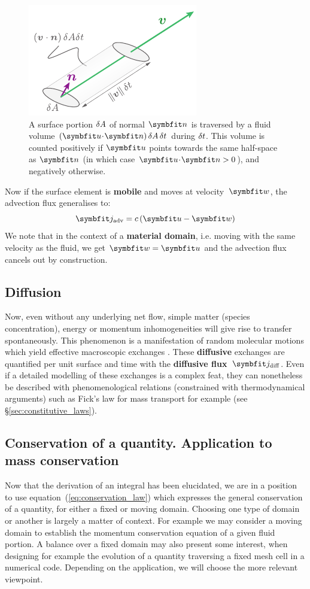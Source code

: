 \begin{figure}[htbp]
\begin{center}
\includegraphics{./pics/slanted_cylinder.pdf}
\caption{A surface portion $\delta A$ of normal $\bn$ is traversed by a fluid volume $\lp\bu \!\cdot\!\bn\rp\delA\,\delt$ during $\delta t$. This volume is counted positively if  $\bu$ points towards the same half-space as $\bn$ (in which case $\bu \!\cdot\! \bn > 0$), and negatively otherwise.}
\label{fig:slanted_cylinder}
\end{center}
\end{figure}
Now if the surface element is \textbf{mobile} and moves at velocity~$\bw$, the advection flux generalises to: 
 \begin{equation}
\bj_\text{adv} = c\, (\bu-\bw)
\end{equation}
We note that in the context of a \textbf{material domain}, i.e. moving with the same velocity as the fluid, we get $\bw = \bu$ and the advection flux cancels out by construction.
\subsection{Diffusion}
Now, even without any underlying net flow, simple matter (species concentration), energy or momentum inhomogeneities will give rise to transfer spontaneously. This phenomenon is a manifestation of random molecular motions which yield effective macroscopic exchanges \citep{Leal2007}. These \textbf{diffusive} exchanges are quantified per unit surface and time with the \textbf{diffusive flux}~$\bj_\text{diff}$. 
Even if a detailed modelling of these exchanges is a complex feat, they can nonetheless be described with phenomenological relations (constrained with thermodynamical arguments) such as Fick's law for mass transport for example (see \S\ref{sec:constitutive_laws}).

\subsection{Conservation of a quantity. Application to mass conservation}
Now that the derivation of an integral has been elucidated, we are in a position to use equation~(\ref{eq:conservation_law}) which expresses the general conservation of a quantity, for either a fixed or moving domain. Choosing one type of domain or another is largely a matter of context. For example we may consider a moving domain to establish the momentum conservation equation of a given fluid portion. A balance over a fixed domain may also present some interest, when designing for example the evolution of a quantity traversing a fixed mesh cell in a numerical code. Depending on the application, we will choose the more relevant viewpoint.

